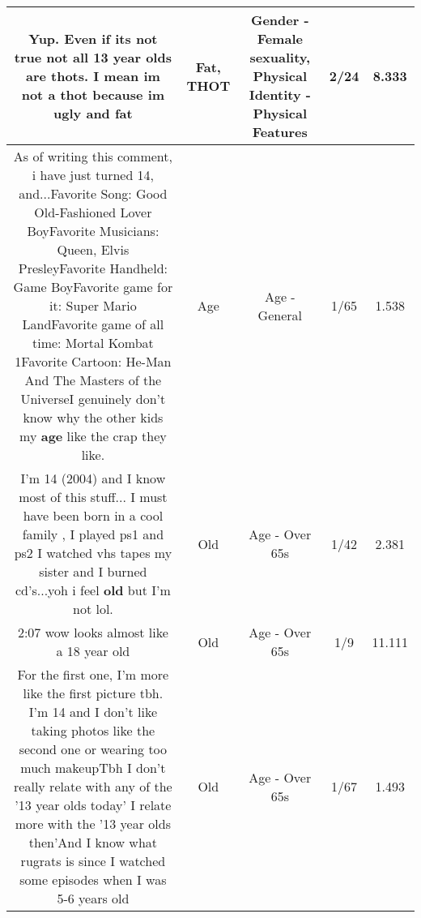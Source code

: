 \documentclass[11pt]{article}
\newlength\mylength
\begin{document}
\begin{center}
\begin{longtable}{|C{.65\mylength}|C{.30\mylength}|C{.12\mylength}|C{.12\mylength}|C{.12\mylength}|}
  \small Yup. Even if its not true not all 13 year olds are thots. I mean im not a \textbf{thot} because im ugly and fat\normalsize   & Fat, THOT & Gender - Female sexuality, Physical Identity - Physical Features & 2/24 & 8.333 \\  \hline
  \small As of writing this comment, i have just turned 14, and...Favorite Song: Good Old-Fashioned Lover BoyFavorite Musicians: Queen, Elvis PresleyFavorite Handheld: Game BoyFavorite game for it: Super Mario LandFavorite game of all time: Mortal Kombat 1Favorite Cartoon: He-Man And The Masters of the UniverseI genuinely don't know why the other kids my \textbf{age} like the crap they like.\normalsize   & Age & Age - General & 1/65 & 1.538 \\  \hline
  \small I'm 14 (2004) and I know most of this stuff... I must have been born in a cool family , I played ps1 and ps2 I watched vhs tapes my sister and I burned cd's...yoh i feel \textbf{old} but I'm not lol.\normalsize   & Old & Age - Over 65s & 1/42 & 2.381 \\  \hline
  \small 2:07 wow looks almost like a 18 year old\normalsize   & Old & Age - Over 65s & 1/9 & 11.111 \\  \hline
  \small For the first one, I'm more like the first picture tbh. I'm 14 and I don't like taking photos like the second one or wearing too much makeupTbh I don't really relate with any of the '13 year olds today' I relate more with the '13 year olds then'And I know what rugrats is since I watched some episodes when I was 5-6 years old\normalsize   & Old & Age - Over 65s & 1/67 & 1.493 \\  \hline

\end{longtable}
\end{center}
\end{document}

